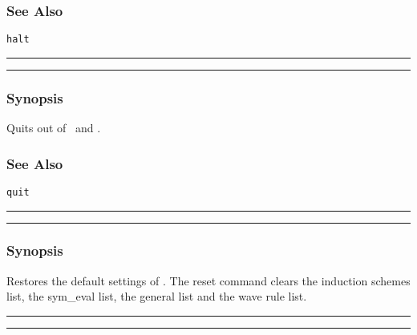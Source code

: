 \subsubsection*{See Also}
{\tt halt}


\vspace{2mm}
\hrule
\vspace{2mm}
\begin{Large}
\end{Large}
\vspace{2mm}
\hrule
\vspace{2mm}


\subsubsection*{Synopsis}
Quits out of \lclam\ and \lprolog.

\subsubsection*{See Also}
{\tt quit}

\vspace{2mm}
\hrule
\vspace{2mm}
\begin{Large}
\end{Large}
\vspace{2mm}
\hrule
\vspace{2mm}


\subsubsection*{Synopsis}
Restores the default settings of \lclam.  The reset command clears the
induction schemes list, the sym\_eval list, the general list and the
wave rule list. \\


\vspace{2mm}
\hrule
\vspace{2mm}
\begin{Large}
\end{Large}
\vspace{2mm}
\hrule
\vspace{2mm}


